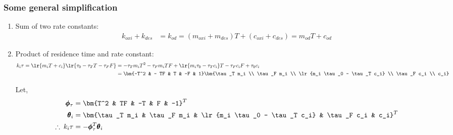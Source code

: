 \subsubsection{Some general simplification}
\begin{enumerate}
        \item Sum of two rate constants:
        \begin{align}
                k_{oxi} + k_{des} &= k_{od} = (m_{oxi} + m_{des}) T + (c_{oxi} + c_{des}) = m_{od} T + c_{od}
        \end{align}

        \item Product of residence time and rate constant:
        \begin{align*}
        k_i \tau  = \lr{m_i T + c_i} \lr{\tau_0 - \tau_T T - \tau_F F}
                  &= - \tau_T m_i T^2 - \tau_F m_i TF + \lr{m_i \tau_0 - \tau_T c_i} T - \tau_F c_i F + \tau_0 c_i \\
                  &= \bm{-T^2 & - TF & T & -F & 1} \bm{\tau_T m_i \\
                                                       \tau_F m_i \\
                                                       \lr{m_i \tau_0 - \tau_T c_i} \\
                                                       \tau_F c_i \\
                                                       c_i}
        \end{align*}

        Let,
        \begin{align}
                \pmb \phi_\tau &= \bm{T^2 & TF & -T & F & -1}^T  \label{eqn::phi_tau}\\
                \pmb \theta_i &= \bm{\tau_T m_i &
                                \tau_F m_i &
                                \lr{m_i \tau_0 - \tau_T c_i} &
                                \tau_F c_i &
                                c_i}^T          \label{eqn::theta_i}\\
                \therefore \: k_i \tau &= - \pmb \phi_\tau^T \pmb \theta_i   \label{eqn::tau_ki}
        \end{align}



\end{enumerate}
